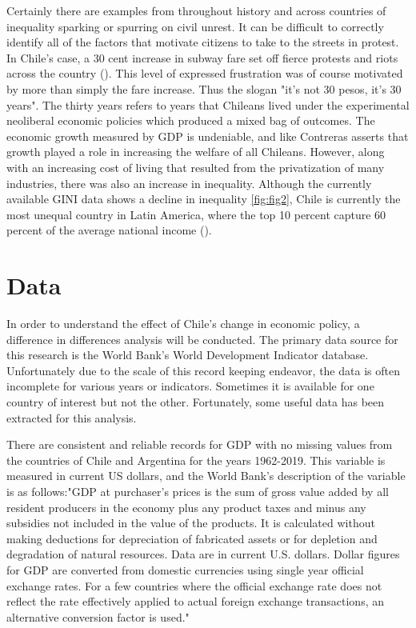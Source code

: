 \documentclass[12pt,english]{article}
\begin{document}
Certainly there are examples from throughout history and across countries of inequality sparking or spurring on civil unrest. It can be difficult to correctly identify all of the factors that motivate citizens to take to the streets in protest. In Chile's case, a 30 cent increase in subway fare set off fierce protests and riots across the country (\citet{Boccardo}). This level of expressed frustration was of course motivated by more than simply the fare increase. Thus the slogan "it's not 30 pesos, it's 30 years". The thirty years refers to years that Chileans lived under the experimental neoliberal economic policies which produced a mixed bag of outcomes. The economic growth measured by GDP is undeniable, and like Contreras asserts that growth played a role in increasing the welfare of all Chileans. However, along with an increasing cost of living that resulted from the privatization of many industries, there was also an increase in inequality. Although the currently available GINI data shows a decline in inequality \ref{fig:fig2}, Chile is currently the most unequal country in Latin America, where the top 10 percent capture 60 percent of the average national income (\citet{by&nbsp;wid.world_2020}). 

\section{Data}\label{sec:data}
In order to understand the effect of Chile's change in economic policy, a difference in differences analysis will be conducted. The primary data source for this research is the World Bank's World Development Indicator database. Unfortunately due to the scale of this record keeping endeavor, the data is often incomplete for various years or indicators. Sometimes it is available for one country of interest but not the other. Fortunately, some useful data has been extracted for this analysis. 

There are consistent and reliable records for GDP with no missing values from the countries of Chile and Argentina for the years 1962-2019. This variable is measured in current US dollars, and the World Bank's description of the variable is as follows:"GDP at purchaser's prices is the sum of gross value added by all resident producers in the economy plus any product taxes and minus any subsidies not included in the value of the products. It is calculated without making deductions for depreciation of fabricated assets or for depletion and degradation of natural resources. Data are in current U.S. dollars. Dollar figures for GDP are converted from domestic currencies using single year official exchange rates. For a few countries where the official exchange rate does not reflect the rate effectively applied to actual foreign exchange transactions, an alternative conversion factor is used."\citet{}
\end{document}
